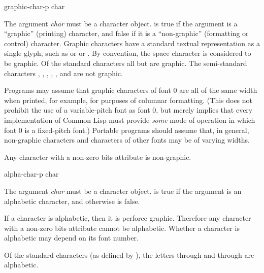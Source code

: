 \begin{defun}[Function]
graphic-char-p char

The argument \emph{char} must be a character object.
 is true if the argument is a ``graphic'' (printing)
character, and false if it is a ``non-graphic'' (formatting or control)
character.  Graphic characters have a standard textual representation
as a single glyph, such as  or \cdf{*} or \cdf{=}.
By convention, the space character is considered to be graphic.
Of the standard characters
all but  are graphic.
The semi-standard characters
, , , , ,
and  are not graphic.

Programs may assume that
graphic characters of font 0 are all of the same width
when printed, for example, for purposes of columnar
formatting.  (This does not prohibit the use of a variable-pitch font
as font 0, but merely implies that every implementation of Common Lisp
must provide \emph{some} mode of operation in which font 0 is
a fixed-pitch font.)
Portable programs should assume that, in general,
non-graphic characters and characters of
other fonts may be of varying widths.

Any character with a non-zero bits attribute is non-graphic.
\end{defun}

\begin{defun}[Function]
alpha-char-p char

The argument \emph{char} must be a character object.
 is true if the argument is an alphabetic
character, and otherwise is false.

If a character is alphabetic, then it is perforce graphic.
Therefore any character with a non-zero bits attribute cannot be alphabetic.
Whether a character is alphabetic may depend on its font number.

Of the standard characters (as defined by ),
the letters  through  and  through  are alphabetic.
\end{defun}

